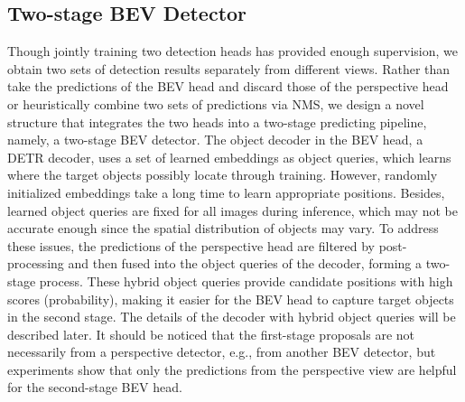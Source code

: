 \documentclass[10pt,twocolumn,letterpaper]{article}
\begin{document}
\subsection{Two-stage BEV Detector}
Though jointly training two detection heads has provided enough supervision, we obtain two sets of detection results separately from different views. 
Rather than take the predictions of the BEV head and discard those of the perspective head or heuristically combine two sets of predictions via NMS, we design a novel structure that integrates the two heads into a two-stage predicting pipeline, namely, a two-stage BEV detector. 
The object decoder in the BEV head, a DETR \cite{DETR} decoder, uses a set of learned embeddings as object queries, which learns where the target objects possibly locate through training. 
However, randomly initialized embeddings take a long time to learn appropriate positions. 
Besides, learned object queries are fixed for all images during inference, which may not be accurate enough since the spatial distribution of objects may vary. 
To address these issues, the predictions of the perspective head are filtered by post-processing and then fused into the object queries of the decoder, forming a two-stage process. 
These hybrid object queries provide candidate positions with high scores (probability), making it easier for the BEV head to capture target objects in the second stage. The details of the decoder with hybrid object queries will be described later. 
It should be noticed that the first-stage proposals are not necessarily from a perspective detector, e.g., from another BEV detector, but experiments show that only the predictions from the perspective view are helpful for the second-stage BEV head. 
\end{document}
